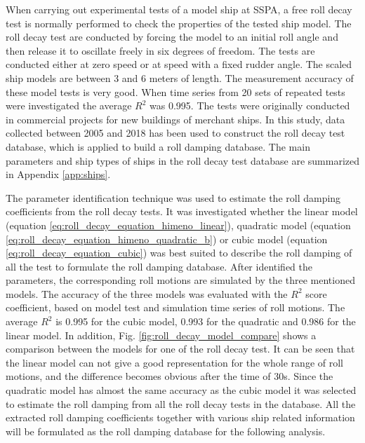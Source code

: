 When carrying out experimental tests of a model ship at SSPA, a free roll decay test is normally performed to check the properties of the tested ship model.
The roll decay test are conducted by forcing the model to an initial roll angle and then release it to oscillate freely in six degrees of freedom. The tests are conducted either  at zero speed or at speed with a fixed rudder angle. The scaled ship models are between 3 and 6 meters of length. The measurement accuracy of these model tests is very good. When time series from 20 sets of repeated tests were investigated the average $R^2$ was 0.995. The tests were originally conducted in commercial projects for new buildings of merchant ships. In this study, data collected between 2005 and 2018 has been used to construct the roll decay test database, which is applied to build a roll damping database. The main parameters and ship types of ships in the roll decay test database are summarized in Appendix \ref{app:ships}. 

The parameter identification technique was used to estimate the roll damping coefficients from the roll decay tests. It was investigated whether the linear model (equation \ref{eq:roll_decay_equation_himeno_linear}), quadratic model (equation \ref{eq:roll_decay_equation_himeno_quadratic_b}) or cubic model (equation \ref{eq:roll_decay_equation_cubic}) was best suited to describe the roll damping of all the test to formulate the roll damping database. After identified the parameters, the corresponding roll motions are simulated by the three mentioned models. The accuracy of the three models was evaluated with the $R^2$ score coefficient, based on model test and simulation time series of roll motions.
The average $R^2$ is 0.995 for the cubic model, 0.993 for the quadratic and 0.986 for the linear model. In addition, Fig. \ref{fig:roll_decay_model_compare} shows a comparison between the models for one of the roll decay test. It can be seen that the linear model can not give a good representation for the whole range of roll motions, and the difference becomes obvious after the time of 30s. Since the quadratic model has almost the same accuracy as the cubic model it was selected to estimate the roll damping from all the roll decay tests in the database. All the extracted roll damping coefficients together with various ship related information will be formulated as the roll damping database for the following analysis.



